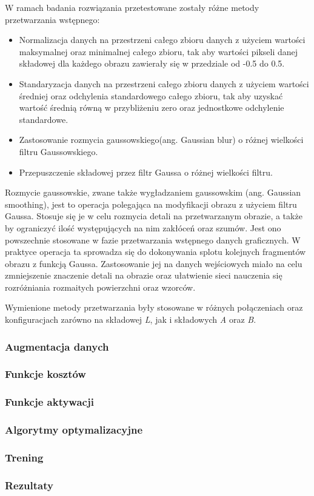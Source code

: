   W ramach badania rozwiązania przetestowane zostały różne metody przetwarzania
  wstępnego:
  \begin{itemize}
  \item Normalizacja danych na przestrzeni całego zbioru danych z użyciem wartości
  maksymalnej oraz minimalnej całego zbioru, tak aby wartości pikseli danej składowej
  dla każdego obrazu zawierały się w przedziale od -0.5 do 0.5.
  \item Standaryzacja danych na przestrzeni całego zbioru danych z użyciem wartości
  średniej oraz odchylenia standardowego całego zbioru, tak aby uzyskać wartość
  średnią równą w przybliżeniu zero oraz jednostkowe odchylenie standardowe.
  \item Zastosowanie rozmycia gaussowskiego(ang. Gaussian blur) o różnej
  wielkości filtru Gaussowskiego.
  \item Przepuszczenie składowej przez filtr Gaussa o różnej wielkości filtru.
  \end{itemize}

  Rozmycie gaussowskie, zwane także wygładzaniem gaussowskim (ang. Gaussian smoothing),
  jest to operacja polegająca na modyfikacji obrazu z użyciem filtru Gaussa.
  Stosuje się je w celu rozmycia detali na przetwarzanym obrazie, a także by
  ograniczyć ilość występujących na nim zakłóceń oraz szumów. Jest ono powszechnie
  stosowane w fazie przetwarzania wstępnego danych graficznych. W praktyce
  operacja ta sprowadza się do dokonywania splotu kolejnych fragmentów obrazu
  z funkcją Gaussa. Zastosowanie jej na danych wejściowych miało na celu
  zmniejszenie znaczenie detali na obrazie oraz ułatwienie sieci nauczenia się
  rozróżniania rozmaitych powierzchni oraz wzorców.

  Wymienione metody przetwarzania były stosowane w różnych połączeniach oraz
  konfiguracjach zarówno na składowej \textit{L}, jak i składowych \textit{A}
  oraz \textit{B}.


  \subsubsection{Augmentacja danych}



  \subsubsection{Funkcje kosztów}

  \subsubsection{Funkcje aktywacji}

  \subsubsection{Algorytmy optymalizacyjne}

  \subsubsection{Trening}

  \subsubsection{Rezultaty}
